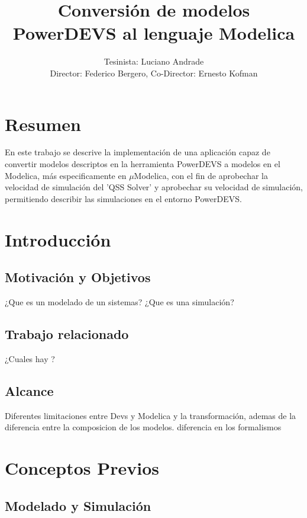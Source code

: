 \documentclass[a4paper,	11pt]{article}
\begin{document}
\renewcommand\floatpagefraction{.9}
\renewcommand\topfraction{.9}
\renewcommand\bottomfraction{.9}
\renewcommand\textfraction{.1}
\setcounter{totalnumber}{50}
\setcounter{topnumber}{50}
\setcounter{bottomnumber}{50}

\title{Conversión de modelos PowerDEVS al lenguaje Modelica}
\author{Tesinista: Luciano Andrade \\ Director: Federico Bergero, Co-Director: Ernesto Kofman} 

\maketitle
\section{Resumen}
En este trabajo se descrive la implementación de una aplicación capaz de convertir modelos descriptos en la herramienta PowerDEVS a modelos en el Modelica, más especificamente en $\mu$Modelica, con el fin de aprobechar la velocidad de simulación del 'QSS Solver' y aprobechar su velocidad de simulación, permitiendo describir las simulaciones en el entorno PowerDEVS.


\section{Introducción}
\subsection{Motivación y Objetivos}
¿Que es un modelado de un sistemas?
¿Que es una simulación?


\subsection{Trabajo relacionado}
¿Cuales hay ?
\subsection{Alcance}
 Diferentes limitaciones entre Devs y Modelica y la transformación, ademas de la diferencia entre la composicion de los modelos.
 diferencia en los formalismos

\section{Conceptos Previos}
\subsection{Modelado y Simulación}
\end{document}
